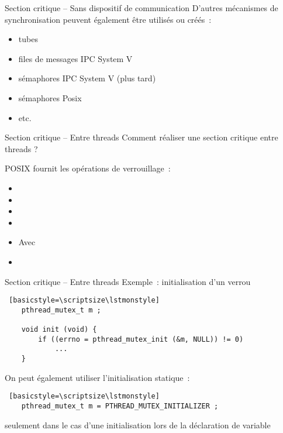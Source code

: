 \begin {frame} {Section critique -- Sans dispositif de communication}
    D'autres mécanismes de synchronisation peuvent également être
    utilisés ou créés~:

    \begin {itemize}
	\item tubes
	\item files de messages IPC System V
	\item sémaphores IPC System V (plus tard)
	\item sémaphores Posix
	\item etc.
    \end {itemize}
\end {frame}

\begin {frame} {Section critique -- Entre threads}
    Comment réaliser une section critique entre threads ?

    POSIX fournit les opérations de verrouillage~:

    \begin {itemize}
	\item {}
	\item {}
	\item {}
	\item {}
	\item {}

	    Avec 
	\item {}
    \end {itemize}
\end {frame}

\begin {frame} [fragile] {Section critique -- Entre threads}
    Exemple~: initialisation d'un verrou

    \begin {lstlisting} [basicstyle=\scriptsize\lstmonstyle]
    pthread_mutex_t m ;

    void init (void) {
        if ((errno = pthread_mutex_init (&m, NULL)) != 0)
            ...
    }
    \end{lstlisting}


    On peut également utiliser l'initialisation statique~:

    \begin {lstlisting} [basicstyle=\scriptsize\lstmonstyle]
    pthread_mutex_t m = PTHREAD_MUTEX_INITIALIZER ;
    \end{lstlisting}

    \implique seulement dans le cas d'une initialisation lors de la
    déclaration de variable

\end{frame}

